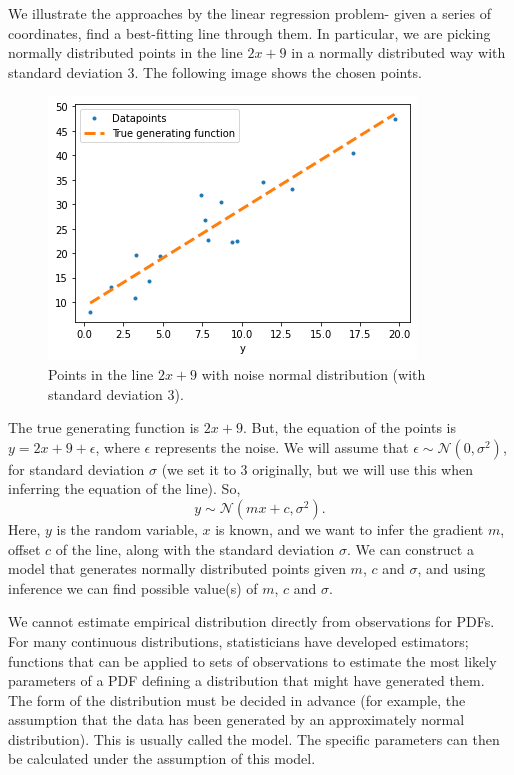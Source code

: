 \documentclass[a4paper, openany]{memoir}
\begin{document}
We illustrate the approaches by the linear regression problem- given a series of coordinates, find a best-fitting line through them. In particular, we are picking normally distributed points in the line $2x + 9$ in a normally distributed way with standard deviation 3. The following image shows the chosen points.
\begin{figure}[H]
    \centering
    \includegraphics[scale=0.6]{src/5.25 linear regression function.png}
    \caption{Points in the line $2x + 9$ with noise normal distribution (with standard deviation 3).}
\end{figure}
\noindent The true generating function is $2x + 9$. But, the equation of the points is $y = 2x + 9 + \epsilon$, where $\epsilon$ represents the noise. We will assume that $\epsilon \sim \mathcal{N}(0, \sigma^2)$, for standard deviation $\sigma$ (we set it to 3 originally, but we will use this when inferring the equation of the line). So,
\[y \sim \mathcal{N}(mx + c, \sigma^2).\]
Here, $y$ is the random variable, $x$ is known, and we want to infer the gradient $m$, offset $c$ of the line, along with the standard deviation $\sigma$. We can construct a model that generates normally distributed points given $m$, $c$ and $\sigma$, and using inference we can find possible value(s) of $m$, $c$ and $\sigma$.

We cannot estimate empirical distribution directly from observations for PDFs. For many continuous distributions, statisticians have developed estimators; functions that can be applied to sets of observations to estimate the most likely parameters of a PDF defining a distribution that might have generated them. The form of the distribution must be decided in advance (for example, the assumption that the data has been generated by an approximately normal distribution). This is usually called the model. The specific parameters can then be calculated under the assumption of this model.
\end{document}

